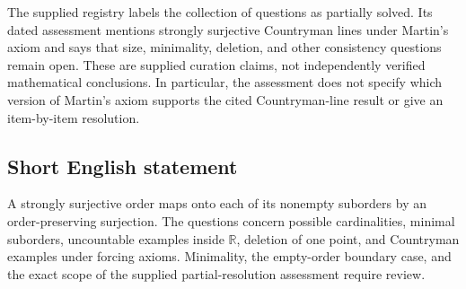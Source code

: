 \documentclass[11pt]{article}
\newcommand{\R}{\mathbb{R}}
\begin{document}
The supplied registry labels the collection of questions as partially solved. Its dated assessment mentions strongly surjective Countryman lines under Martin's axiom and says that size, minimality, deletion, and other consistency questions remain open. These are supplied curation claims, not independently verified mathematical conclusions. In particular, the assessment does not specify which version of Martin's axiom supports the cited Countryman-line result or give an item-by-item resolution.
\subsection{Short English statement}
A strongly surjective order maps onto each of its nonempty suborders by an order-preserving surjection. The questions concern possible cardinalities, minimal suborders, uncountable examples inside \(\R\), deletion of one point, and Countryman examples under forcing axioms. Minimality, the empty-order boundary case, and the exact scope of the supplied partial-resolution assessment require review.
\end{document}
